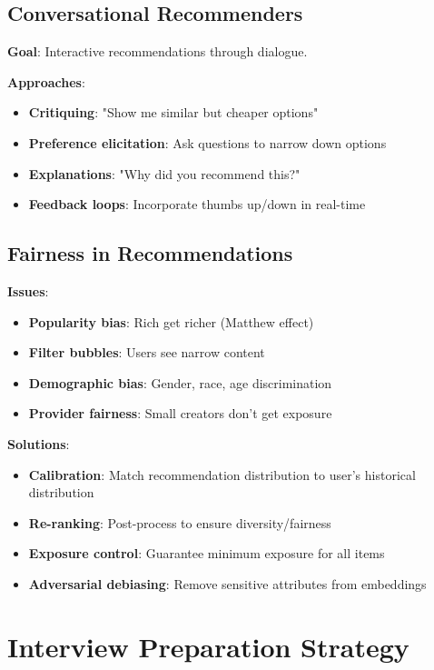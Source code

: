 \documentclass[10pt]{article}
\begin{document}
\subsection{Conversational Recommenders}

\textbf{Goal}: Interactive recommendations through dialogue.

\textbf{Approaches}:
\begin{itemize}[leftmargin=*]
    \item \textbf{Critiquing}: "Show me similar but cheaper options"
    \item \textbf{Preference elicitation}: Ask questions to narrow down options
    \item \textbf{Explanations}: "Why did you recommend this?"
    \item \textbf{Feedback loops}: Incorporate thumbs up/down in real-time
\end{itemize}

\subsection{Fairness in Recommendations}

\textbf{Issues}:
\begin{itemize}[leftmargin=*]
    \item \textbf{Popularity bias}: Rich get richer (Matthew effect)
    \item \textbf{Filter bubbles}: Users see narrow content
    \item \textbf{Demographic bias}: Gender, race, age discrimination
    \item \textbf{Provider fairness}: Small creators don't get exposure
\end{itemize}

\textbf{Solutions}:
\begin{itemize}[leftmargin=*]
    \item \textbf{Calibration}: Match recommendation distribution to user's historical distribution
    \item \textbf{Re-ranking}: Post-process to ensure diversity/fairness
    \item \textbf{Exposure control}: Guarantee minimum exposure for all items
    \item \textbf{Adversarial debiasing}: Remove sensitive attributes from embeddings
\end{itemize}

\section{Interview Preparation Strategy}
\end{document}
